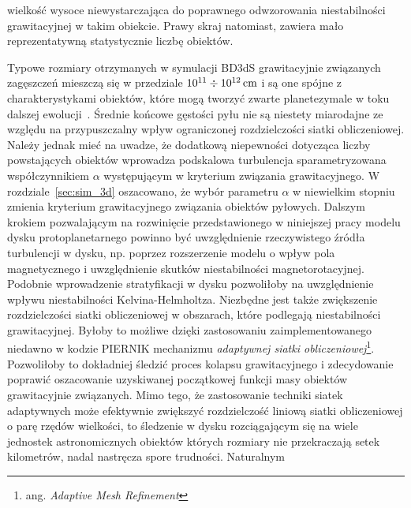 wielkość wysoce niewystarczająca do poprawnego odwzorowania niestabilności
grawitacyjnej w takim obiekcie.  Prawy skraj natomiast, zawiera mało
reprezentatywną statystycznie liczbę obiektów.
%
\par Typowe rozmiary otrzymanych w symulacji BD3dS grawitacyjnie związanych
zagęszczeń mieszczą się w przedziale $10^{11} \div 10^{12}\hbox{$\thinspace\textrm{cm}$}$ i są one spójne z
charakterystykami obiektów, które mogą tworzyć zwarte planetezymale w toku
dalszej ewolucji~\cite{HS08}. Średnie końcowe gęstości pyłu nie są niestety
miarodajne ze względu na przypuszczalny wpływ ograniczonej rozdzielczości siatki
obliczeniowej. Należy jednak mieć na uwadze, że dodatkową niepewności dotycząca
liczby powstających obiektów wprowadza podskalowa turbulencja sparametryzowana
współczynnikiem $\alpha$ występującym w kryterium związania
grawitacyjnego.
W rozdziale~\ref{sec:sim_3d} oszacowano, że wybór parametru $\alpha$ w
niewielkim stopniu zmienia kryterium grawitacyjnego związania obiektów pyłowych.
Dalszym krokiem pozwalającym na rozwinięcie przedstawionego w niniejszej pracy
modelu dysku protoplanetarnego powinno być uwzględnienie rzeczywistego źródła
turbulencji w dysku, np. poprzez rozszerzenie modelu o wpływ pola magnetycznego
i uwzględnienie skutków niestabilności magnetorotacyjnej. Podobnie wprowadzenie
stratyfikacji w dysku pozwoliłoby na uwzględnienie wpływu niestabilności
Kelvina-Helmholtza.  Niezbędne jest także zwiększenie rozdzielczości siatki
obliczeniowej w obszarach, które podlegają niestabilności grawitacyjnej. Byłoby
to możliwe dzięki zastosowaniu zaimplementowanego niedawno w kodzie
\textsc{PIERNIK} mechanizmu \emph{adaptywnej siatki obliczeniowej}\footnote{ang.
\emph{Adaptive Mesh Refinement}}. Pozwoliłoby to dokładniej śledzić proces
kolapsu grawitacyjnego i zdecydowanie poprawić oszacowanie uzyskiwanej
początkowej funkcji masy obiektów grawitacyjnie związanych.  Mimo tego, że
zastosowanie techniki siatek adaptywnych może efektywnie zwiększyć rozdzielczość
liniową siatki obliczeniowej o parę rzędów wielkości, to śledzenie w dysku
rozciągającym się na wiele jednostek astronomicznych obiektów których rozmiary
nie przekraczają setek kilometrów, nadal nastręcza spore trudności.  Naturalnym
